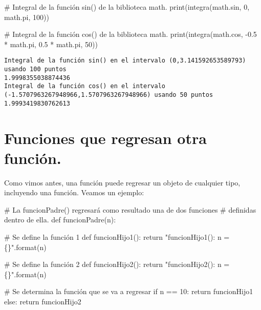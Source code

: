 \documentclass[
  letterpaper,
  DIV=11,
  numbers=noendperiod]{scrreprt}
\newenvironment{Shaded}{\begin{snugshade}}{\end{snugshade}}
\newcommand{\BuiltInTok}[1]{\textcolor[rgb]{0.00,0.23,0.31}{#1}}
\newcommand{\CommentTok}[1]{\textcolor[rgb]{0.37,0.37,0.37}{#1}}
\newcommand{\ControlFlowTok}[1]{\textcolor[rgb]{0.00,0.23,0.31}{#1}}
\newcommand{\DecValTok}[1]{\textcolor[rgb]{0.68,0.00,0.00}{#1}}
\newcommand{\FloatTok}[1]{\textcolor[rgb]{0.68,0.00,0.00}{#1}}
\newcommand{\KeywordTok}[1]{\textcolor[rgb]{0.00,0.23,0.31}{#1}}
\newcommand{\NormalTok}[1]{\textcolor[rgb]{0.00,0.23,0.31}{#1}}
\newcommand{\OperatorTok}[1]{\textcolor[rgb]{0.37,0.37,0.37}{#1}}
\newcommand{\SpecialCharTok}[1]{\textcolor[rgb]{0.37,0.37,0.37}{#1}}
\newcommand{\StringTok}[1]{\textcolor[rgb]{0.13,0.47,0.30}{#1}}
\begin{document}
\begin{Shaded}
\begin{Highlighting}[]
\CommentTok{\# Integral de la función sin() de la biblioteca math.}
\BuiltInTok{print}\NormalTok{(integra(math.sin, }\DecValTok{0}\NormalTok{, math.pi, }\DecValTok{100}\NormalTok{))}

\CommentTok{\# Integral de la función cos() de la biblioteca math.}
\BuiltInTok{print}\NormalTok{(integra(math.cos, }\OperatorTok{{-}}\FloatTok{0.5} \OperatorTok{*}\NormalTok{ math.pi, }\FloatTok{0.5} \OperatorTok{*}\NormalTok{ math.pi, }\DecValTok{50}\NormalTok{))}
\end{Highlighting}
\end{Shaded}

\begin{verbatim}
Integral de la función sin() en el intervalo (0,3.141592653589793) usando 100 puntos
1.9998355038874436
Integral de la función cos() en el intervalo (-1.5707963267948966,1.5707963267948966) usando 50 puntos
1.9993419830762613
\end{verbatim}


\chapter{Funciones que regresan otra
función.}\label{funciones-que-regresan-otra-funciuxf3n.}

Como vimos antes, una función puede regresar un objeto de cualquier
tipo, incluyendo una función. Veamos un ejemplo:

\begin{Shaded}
\begin{Highlighting}[]
\CommentTok{\# La funcionPadre() regresará como resultado una de dos funciones}
\CommentTok{\# definidas dentro de ella.}
\KeywordTok{def}\NormalTok{ funcionPadre(n):}

    \CommentTok{\# Se define la función 1}
    \KeywordTok{def}\NormalTok{ funcionHijo1():}
        \ControlFlowTok{return} \StringTok{"funcionHijo1(): n = }\SpecialCharTok{\{\}}\StringTok{"}\NormalTok{.}\BuiltInTok{format}\NormalTok{(n)}

    \CommentTok{\# Se define la función 2}
    \KeywordTok{def}\NormalTok{ funcionHijo2():}
        \ControlFlowTok{return} \StringTok{"funcionHijo2(): n = }\SpecialCharTok{\{\}}\StringTok{"}\NormalTok{.}\BuiltInTok{format}\NormalTok{(n)}

    \CommentTok{\# Se determina la función que se va a regresar}
    \ControlFlowTok{if}\NormalTok{ n }\OperatorTok{==} \DecValTok{10}\NormalTok{:}
        \ControlFlowTok{return}\NormalTok{ funcionHijo1}
    \ControlFlowTok{else}\NormalTok{:}
        \ControlFlowTok{return}\NormalTok{ funcionHijo2}
\end{Highlighting}
\end{Shaded}
\end{document}
